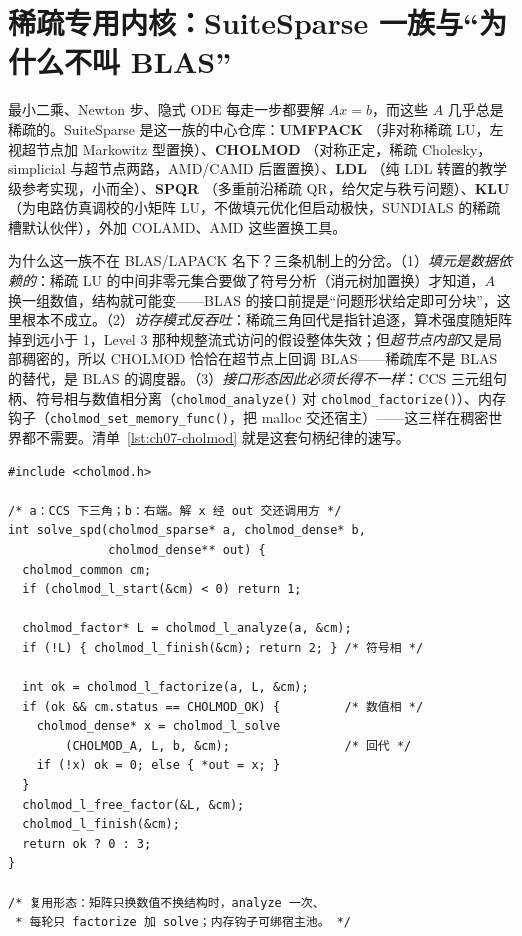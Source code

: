 \documentclass[12pt,a4paper,fontset=fandol]{ctexbook}
\newcommand{\Fn}[1]{\texttt{#1()}}
\newcommand{\Bk}{\allowbreak}
\newcommand{\Lib}[1]{\textbf{#1}}
\begin{document}
\section{稀疏专用内核：SuiteSparse 一族与``为什么不叫 BLAS''}\label{sec:ch07-sparse}

最小二乘、Newton 步、隐式 ODE 每走一步都要解 $Ax=b$，而这些 $A$ 几乎总是稀疏的。SuiteSparse 是这一族的中心仓库：\Lib{UMFPACK} \Bk{}（非对称稀疏 LU，左视超节点加 Markowitz 型置换）、\Lib{CHOLMOD} \Bk{}（对称正定，稀疏 Cholesky， simplicial 与超节点两路，AMD/CAMD 后置置换）、\Lib{LDL} \Bk{}（纯 LDL 转置的教学级参考实现，小而全）、\Lib{SPQR} \Bk{}（多重前沿稀疏 QR，给欠定与秩亏问题）、\Lib{KLU} \Bk{}（为电路仿真调校的小矩阵 LU，不做填元优化但启动极快，SUNDIALS 的稀疏槽默认伙伴），外加 COLAMD、AMD 这些置换工具。

为什么这一族不在 BLAS/LAPACK 名下？三条机制上的分岔。（1）\emph{填元是数据依赖的}：稀疏 LU 的中间非零元集合要做了符号分析（消元树加置换）才知道，$A$ 换一组数值，结构就可能变——BLAS 的接口前提是``问题形状给定即可分块''，这里根本不成立。（2）\emph{访存模式反吞吐}：稀疏三角回代是指针追逐，算术强度随矩阵掉到远小于 1，Level 3 那种规整流式访问的假设整体失效；但\emph{超节点内部}又是局部稠密的，所以 CHOLMOD 恰恰在超节点上回调 BLAS——稀疏库不是 BLAS 的替代，是 BLAS 的调度器。（3）\emph{接口形态因此必须长得不一样}：CCS 三元组句柄、符号相与数值相分离（\Fn{cholmod\_analyze} 对 \Fn{cholmod\_factorize}）、内存钩子（\Fn{cholmod\_set\_memory\_func}，把 malloc 交还宿主）——这三样在稠密世界都不需要。清单~\ref{lst:ch07-cholmod} 就是这套句柄纪律的速写。

\begin{lstlisting}[style=cstyle,caption={CHOLMOD（长索引接口）：符号相、数值相、回代三段},label={lst:ch07-cholmod}]
#include <cholmod.h>

/* a：CCS 下三角；b：右端。解 x 经 out 交还调用方 */
int solve_spd(cholmod_sparse* a, cholmod_dense* b,
              cholmod_dense** out) {
  cholmod_common cm;
  if (cholmod_l_start(&cm) < 0) return 1;

  cholmod_factor* L = cholmod_l_analyze(a, &cm);
  if (!L) { cholmod_l_finish(&cm); return 2; } /* 符号相 */

  int ok = cholmod_l_factorize(a, L, &cm);
  if (ok && cm.status == CHOLMOD_OK) {         /* 数值相 */
    cholmod_dense* x = cholmod_l_solve
        (CHOLMOD_A, L, b, &cm);                /* 回代 */
    if (!x) ok = 0; else { *out = x; }
  }
  cholmod_l_free_factor(&L, &cm);
  cholmod_l_finish(&cm);
  return ok ? 0 : 3;
}

/* 复用形态：矩阵只换数值不换结构时，analyze 一次、
 * 每轮只 factorize 加 solve；内存钩子可绑宿主池。 */
\end{lstlisting}
\end{document}
